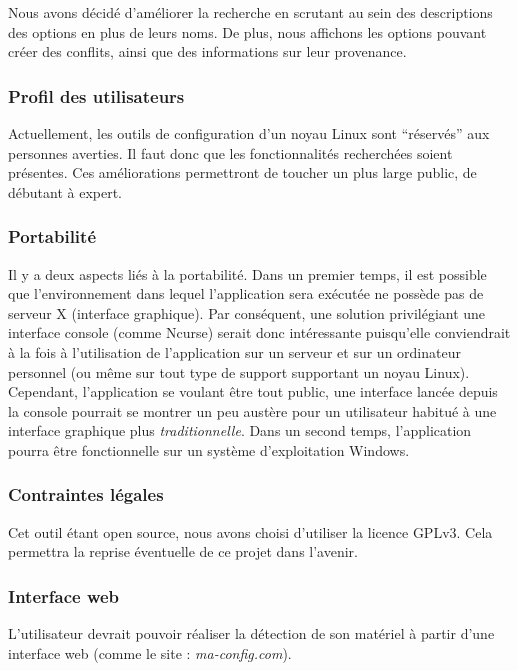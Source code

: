 ﻿\documentclass[17pts]{report}
\begin{document}
Nous avons décidé d’améliorer la recherche en scrutant au sein des descriptions
des options en plus de leurs noms. De plus, nous affichons les options pouvant
créer des conflits, ainsi que des informations sur leur provenance.

\subsubsection{Profil des utilisateurs}
\label{ssub:Profil des utilisateurs}
Actuellement, les outils de configuration d’un noyau Linux sont “réservés” aux
personnes averties. Il faut donc que les fonctionnalités recherchées soient
présentes. Ces améliorations permettront de toucher un plus large public, de
débutant à expert.

\subsubsection{Portabilité}
\label{ssub:Portabilité}
Il y a deux aspects liés à la portabilité. Dans un premier temps, il est
possible que l’environnement dans lequel l’application sera exécutée ne possède
pas de serveur X (interface graphique). Par conséquent, une solution
privilégiant une interface console (comme Ncurse) serait donc intéressante
puisqu’elle conviendrait à la fois à l’utilisation de l’application sur un
serveur et sur un ordinateur personnel (ou même sur tout type de support
supportant un noyau Linux). Cependant, l’application se voulant être tout
public, une interface lancée depuis la console pourrait se montrer un peu
austère pour un utilisateur habitué à une interface graphique plus
\textit{traditionnelle}.  Dans un second temps, l’application pourra être
fonctionnelle sur un système d’exploitation Windows.

\subsubsection{Contraintes légales}
\label{ssub:Contraintes légales}
Cet outil étant open source, nous avons choisi d’utiliser la licence GPLv3.
Cela permettra la reprise éventuelle de ce projet dans l’avenir.

\subsubsection{Interface web}
\label{ssub:Interface web}
L’utilisateur devrait pouvoir réaliser la détection de son matériel à partir
d’une interface web (comme le site : \textit{ma-config.com}).
\end{document}
